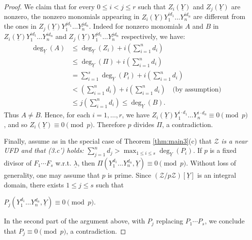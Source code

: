 \documentclass[10pt,a4paper]{amsart}
\begin{document}
\begin{proof}
\noindent
We claim that for every $0 \leq i<j \leq r$ such that $Z_i(\underline{Y})$ and $Z_j(\underline{Y})$ are nonzero, the nonzero monomials appearing in $Z_i(\underline{Y})Y_1^{id_1}\dots Y_n^{id_n}$ are different from the ones in $Z_j(\underline{Y})Y_1^{jd_1}\dots Y_n^{j d_n}$. Indeed for nonzero monomials $A$ and $B$ in $Z_i(\underline{Y})Y_1^{id_1}\dots Y_n^{id_n}$ and $Z_j(\underline{Y})Y_1^{jd_1}\dots Y_n^{j d_n}$ respectively, we have:
\begin{align*}
\deg_{\underline{Y}}(A) &\leq \deg_{\underline{Y}}(Z_i)+i\left(\sum_{i=1}^n d_i\right)\\
&\leq \deg_{\underline{Y}}(\Pi)+i\left(\sum_{i=1}^n d_i\right)\\
&= \sum_{i=1}^s\deg_{\underline{Y}}(P_i)+i\left(\sum_{i=1}^n d_i\right)\\
&<\left(\sum_{i=1}^n d_i\right)+i\left(\sum_{i=1}^n d_i\right) \quad \textrm{(by assumption)}\\
&\leq j\left(\sum_{i=1}^n d_i\right)\leq \deg_{\underline{Y}}(B).
\end{align*}
Thus $A \neq B$.
Hence, for each $i=1,\ldots, r$, we have $Z_i(\underline{Y})Y_1^{i\cdot d_1}\dots Y_n^{i \cdot d_n}\equiv 0 \pmod{p}$, and so $Z_i(\underline{Y}) \equiv 0 \pmod{p}$. Therefore $p$ divides $\Pi$, a contradiction.

\vskip 2mm


Finally, assume as in the special case of Theorem \ref{thm:main3}(c) that \emph{$\mathcal{Z}$ is a near UFD and that \hbox{\rm (3.c')} holds: $\sum_{j=1}^nd_j> \max_{1 \leq i \leq s}\deg_{\underline{Y}}(P_i)$.} If $p$ is a fixed divisor of $F_1\cdots F_s$ \hbox{w.r.t.} $\underline \lambda$, then $\Pi(Y_1^{d_1}\dots Y_n^{d_n},\underline{Y})\equiv 0 \pmod{p}$. Without loss of generality, one may assume that $p$ is prime. Since $(\mathcal{Z}/p\mathcal{Z})[\underline{Y}]$ is an integral domain, there exists $1 \leq j \leq s$ such that 
\vskip 1mm

\centerline{$P_{j}(Y_1^{d_1}\dots Y_n^{d_n},\underline{Y})\equiv 0 \pmod{p}$.}
\vskip 1mm

\noindent
In the second part of the argument above, with $P_j$ replacing $P_1\cdots P_s$, we conclude that $P_j \equiv 0 \pmod{p}$, a contradiction.
\end{proof}
\end{document}
